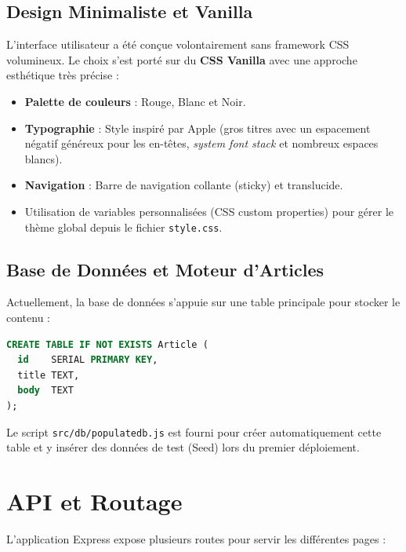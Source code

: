 \documentclass[12pt,a4paper]{article}
\begin{document}
\subsection{Design Minimaliste et Vanilla}
L'interface utilisateur a été conçue volontairement sans framework CSS volumineux. Le choix s'est porté sur du \textbf{CSS Vanilla} avec une approche esthétique très précise :
\begin{itemize}
    \item \textbf{Palette de couleurs} : Rouge, Blanc et Noir.
    \item \textbf{Typographie} : Style inspiré par Apple (gros titres avec un espacement négatif généreux pour les en-têtes, \textit{system font stack} et nombreux espaces blancs).
    \item \textbf{Navigation} : Barre de navigation collante (sticky) et translucide.
    \item Utilisation de variables personnalisées (CSS custom properties) pour gérer le thème global depuis le fichier \texttt{style.css}.
\end{itemize}

\subsection{Base de Données et Moteur d'Articles}
Actuellement, la base de données s'appuie sur une table principale pour stocker le contenu :
\begin{lstlisting}[language=SQL, title=Schéma de la table Article]
CREATE TABLE IF NOT EXISTS Article (
  id    SERIAL PRIMARY KEY,
  title TEXT,
  body  TEXT
);
\end{lstlisting}
Le script \texttt{src/db/populatedb.js} est fourni pour créer automatiquement cette table et y insérer des données de test (Seed) lors du premier déploiement.

\section{API et Routage}

L'application Express expose plusieurs routes pour servir les différentes pages :
\end{document}
